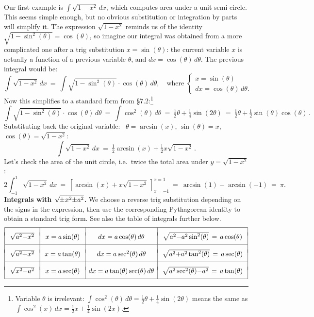 \documentclass[11pt]{article}
\newcommand{\ts}{\textstyle}
\begin{document}
Our first example is $\int\! \sqrt{1-x^2}\,dx$, which computes area under a unit semi-circle.
This seems simple enough, but no obvious substitution or integration by parts will simplify it.
The expression $\sqrt{1-x^2}$ reminds us of the identity $\sqrt{1-\sin^2(\theta)}=\cos(\theta)$,
so imagine our integral was obtained from a more complicated one after a
trig substitution $x=\sin(\theta)$: 
the current variable $x$ is actually a function of a previous variable $\theta$, 
and $dx=\cos(\theta)\,d\theta$. The previous integral would be:
$$
\int\!\! \sqrt{1{-}x^2}\,dx \ =\ \int\!\!{\ts\sqrt{1{-}\sin^2(\theta)}}\cdot\cos(\theta)\,d\theta,
\quad\text{where }
\left\{\!\!\begin{array}{c}x=\sin(\theta)\\[.3em] dx=\cos(\theta)\,d\theta.\end{array}\right.
$$
Now this simplifies to a standard form from \S7.2:\footnote{
Variable $\theta$ is irrelevant:
$\int\!\cos^2(\theta)\,d\theta = \tfrac12\theta{+}\tfrac14\sin(2\theta)$
means the same as 
$\int\!\cos^2(x)\,dx = \tfrac12x{+}\tfrac14\sin(2x)$.
}
$$
\int\!{\ts\sqrt{1{-}\sin^2(\theta)}\cdot\cos(\theta)\,d\theta}
\ =\
\int\!\cos^2(\theta)\,d\theta
\ =\
\tfrac12\theta + \tfrac14\sin(2\theta)
\ =\
\tfrac12\theta + \tfrac12\sin(\theta)\cos(\theta)\,.
$$
Substituting back the original variable: \
$\theta=\arcsin(x)$, $\sin(\theta)=x$, $\cos(\theta)=\sqrt{1{-}x^2}$:
$$
\int\!\! \sqrt{1{-}x^2}\,dx \ =\ \tfrac12\arcsin(x) + \tfrac12x\sqrt{1{-}x^2}\,.
$$
Let's check the area of the unit circle, i.e.~twice the total area under $y=\sqrt{1{-}x^2}$:
$$
2\int_{-1}^{1} \!\!\!\! \sqrt{1{-}x^2}\,dx \ =\ 
\left[\arcsin(x) + x\sqrt{1{-}x^2}\,\right]_{x=-1}^{x=1}
\ =\
\arcsin(1) -\arcsin(-1)
\ =\
\pi.
$$
{\bf Integrals with $\sqrt{\vphantom{x^2}\!\! \pm\! x^2{\pm} a^2}$.}
We choose a reverse trig substitution depending on the signs in the expression, 
then use the corresponding Pythagorean identity to obtain a standard trig form.
See also the table of integrals further below.
$$\begin{array}{|c|c|c|c|}
\hline &&& \\[-.5em] 
\ \sqrt{a^2{-}x^2}\  & \ x = a\sin(\theta)\ &\ dx = a\cos(\theta)\,d\theta\ & 
\ \sqrt{a^2{-}a^2\sin^2(\theta)} \,=\, a\cos(\theta)\
\\[.5em] \hline &&& \\[-.5em] 
\sqrt{a^2{+}x^2} & x = a\tan(\theta) & dx = a\sec^2(\theta)\,d\theta & 
\sqrt{a^2{+}a^2\tan^2(\theta)} \,=\, a\sec(\theta)
\\[.5em] \hline &&& \\[-.5em] 
\sqrt{x^2{-}a^2} & x = a\sec(\theta) & dx = a\tan(\theta)\sec(\theta)\,d\theta & 
\sqrt{a^2\sec^2(\theta){-}a^2} \,=\, a\tan(\theta)
\\[.5em] \hline 
\end{array}$$
\end{document}
